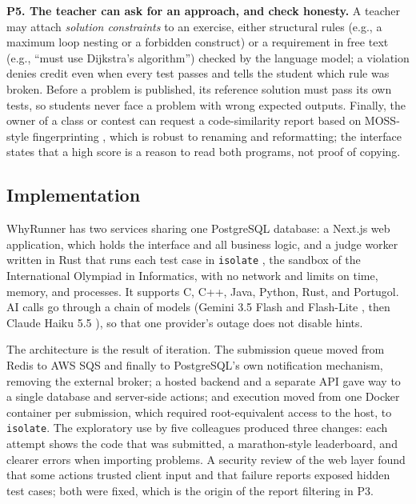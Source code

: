 \documentclass[12pt]{article}
\begin{document}
\textbf{P5. The teacher can ask for an approach, and check honesty.}\label{sec:prepublish-validation}\label{sec:similarity} A teacher may attach \emph{solution constraints} to an exercise, either structural rules (e.g., a maximum loop nesting or a forbidden construct) or a requirement in free text (e.g., ``must use Dijkstra's algorithm'') checked by the language model; a violation denies credit even when every test passes and tells the student which rule was broken. Before a problem is published, its reference solution must pass its own tests, so students never face a problem with wrong expected outputs. Finally, the owner of a class or contest can request a code-similarity report based on MOSS-style fingerprinting \cite{schleimer2003winnowing}, which is robust to renaming and reformatting; the interface states that a high score is a reason to read both programs, not proof of copying.

\subsection{Implementation}\label{sec:implementation}\label{sec:execution-environment}\label{sec:integration}

WhyRunner has two services sharing one PostgreSQL database: a Next.js web application, which holds the interface and all business logic, and a judge worker written in Rust that runs each test case in \texttt{isolate} \cite{mares2012isolate}, the sandbox of the International Olympiad in Informatics, with no network and limits on time, memory, and processes. It supports C, C++, Java, Python, Rust, and Portugol. AI calls go through a chain of models (Gemini 3.5 Flash and Flash-Lite \cite{gemini2023}, then Claude Haiku 5.5 \cite{anthropic2026haiku}), so that one provider's outage does not disable hints.

The architecture is the result of iteration. The submission queue moved from Redis to AWS SQS and finally to PostgreSQL's own notification mechanism, removing the external broker; a hosted backend and a separate API gave way to a single database and server-side actions; and execution moved from one Docker container per submission, which required root-equivalent access to the host, to \texttt{isolate}. The exploratory use by five colleagues produced three changes: each attempt shows the code that was submitted, a marathon-style leaderboard, and clearer errors when importing problems. A security review of the web layer found that some actions trusted client input and that failure reports exposed hidden test cases; both were fixed, which is the origin of the report filtering in P3.
\end{document}
